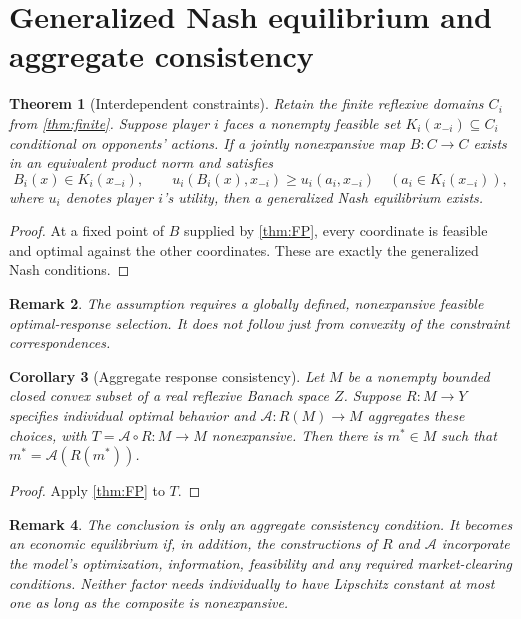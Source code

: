 \documentclass[11pt]{article}
\newtheorem{theorem}{Theorem}[section]
\newtheorem{corollary}[theorem]{Corollary}
\newtheorem{remark}[theorem]{Remark}
\theoremstyle{definition}\newtheorem{definition}[theorem]{Definition}
\begin{document}
\section{Generalized Nash equilibrium and aggregate consistency}
\begin{theorem}[Interdependent constraints\label{thm:generalized}]
Retain the finite reflexive domains $C_i$ from \cref{thm:finite}. Suppose player $i$ faces a nonempty feasible set $K_i(x_{-i})\subseteq C_i$ conditional on opponents' actions. If a jointly nonexpansive map $B:C\to C$ exists in an equivalent product norm and satisfies
\[B_i(x)\in K_i(x_{-i}),\qquad
u_i(B_i(x),x_{-i})\ge u_i(a_i,x_{-i})\quad
( a_i\in K_i(x_{-i})),\]
where $u_i$ denotes player $i$'s utility, then a generalized Nash equilibrium exists.
\end{theorem}
\begin{proof}
At a fixed point of $B$ supplied by \cref{thm:FP}, every coordinate is feasible and optimal against the other coordinates. These are exactly the generalized Nash conditions.
\end{proof}
\begin{remark}
The assumption requires a globally defined, nonexpansive \emph{feasible optimal-response selection}. It does not follow just from convexity of the constraint correspondences.
\end{remark}

\begin{corollary}[Aggregate response consistency\label{cor:aggregate}]
Let $M$ be a nonempty bounded closed convex subset of a real reflexive Banach space $Z$. Suppose $R:M\to Y$ specifies individual optimal behavior and $\mathcal A:R(M)\to M$ aggregates these choices, with $T=\mathcal A\circ R:M\to M$ nonexpansive. Then there is $m^*\in M$ such that $m^*=\mathcal A(R(m^*))$.
\end{corollary}
\begin{proof}
Apply \cref{thm:FP} to $T$.\end{proof}
\begin{remark}
The conclusion is only an aggregate consistency condition. It becomes an economic equilibrium if, in addition, the constructions of $R$ and $\mathcal A$ incorporate the model's optimization, information, feasibility and any required market-clearing conditions. Neither factor needs individually to have Lipschitz constant at most one as long as the composite is nonexpansive.
\end{remark}
\end{document}
